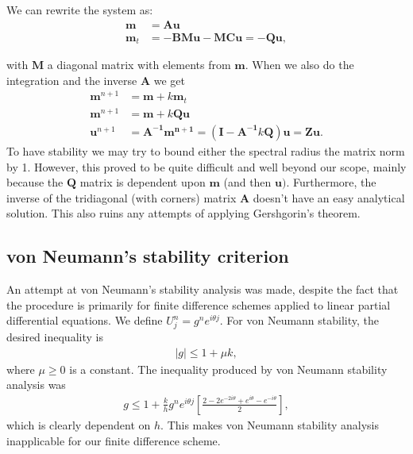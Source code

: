 We can rewrite the system as:
\begin{align*}
\bm{m} &= \bm{Au} \\
\bm{m}_t &= -\bm{BMu} - \bm{MCu} = \bm{-Qu},
\end{align*}

with $\bm{M}$ a diagonal matrix with elements from $\bm{m}$. When we also do the integration and the inverse $\bm{A}$ we get
\begin{align*}
\bm{m}^{n+1} &= \bm{m} + k\bm{m}_t \\
\bm{m}^{n+1} &= \bm{m} + k\bm{Qu} \\
\bm{u}^{n+1} &= \bm{A^{-1}m^{n+1}} = \left(\bm{I} -\bm{A^{-1}}k\bm{Q}\right)\bm{u} = \bm{Zu}.
\end{align*}
To have stability we may try to bound either the spectral radius the matrix norm by 1. However, this proved to be quite difficult and well beyond our scope, mainly because the $\bm{Q}$ matrix is dependent upon $\bm{m}$ (and then $\bm{u})$. Furthermore, the inverse of the tridiagonal (with corners) matrix $\bm{A}$ doesn't have an easy analytical solution. This also ruins any attempts of applying Gershgorin's theorem.

\subsection*{von Neumann's stability criterion}
An attempt at von Neumann's stability analysis was made, despite the fact that the procedure is primarily for finite difference schemes applied to linear partial differential equations. We define $U_{j}^{n} = g^{n}e^{i\theta j}$. For von Neumann stability, the desired inequality is
\begin{align}
|g| \leq 1 + \mu k,
\end{align}
where $\mu \geq 0$ is a constant. 
The inequality produced by von Neumann stability analysis was
\begin{align}
g \leq 1+ \frac{k}{h} g^{n}e^{i\theta j}\left[\frac{2-2e^{-2i\theta}+ e^{i\theta} - e^{-i\theta}}{2}\right],
\end{align}
which is clearly dependent on $h$. This makes von Neumann stability analysis inapplicable for our finite difference scheme.

